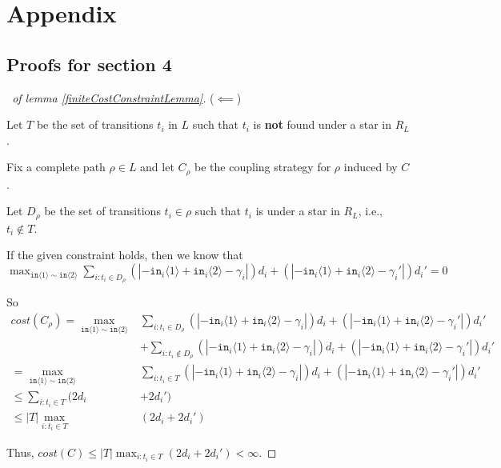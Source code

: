 \documentclass[12pt]{article}
\newcommand{\brangle}[1]{\langle#1 \rangle}
\theoremstyle{definition}
\begin{document}
\section{Appendix}

\subsection{Proofs for section 4}


\begin{proof}[\proofname~of lemma \ref{finiteCostConstraintLemma}]

    ($\impliedby$)

    Let $T$ be the set of transitions $t_i$ in $L$ such that $t_i$ is \textbf{not} found under a star in $R_L$. 

    Fix a complete path $\rho\in L$ and let $C_\rho$ be the coupling strategy for $\rho$ induced by $C$. 

    Let $D_\rho$ be the set of transitions $t_i\in \rho$ such that $t_i$ is under a star in $R_L$, i.e., $t_i\notin T$.  

    If the given constraint holds, then we know that $\max_{\texttt{in}\brangle{1}\sim\texttt{in}\brangle{2}}\sum_{i: t_i\in D_\rho}(|-\texttt{in}_i\brangle{1}+\texttt{in}_i\brangle{2}-\gamma_i|)d_i+(|-\texttt{in}_i\brangle{1}+\texttt{in}_i\brangle{2}-\gamma_i'|)d_i' = 0$

    So \begin{align*}
        cost(C_\rho) = \max_{\texttt{in}\brangle{1}\sim\texttt{in}\brangle{2}}&\sum_{i: t_i\in D_\rho}(|-\texttt{in}_i\brangle{1}+\texttt{in}_i\brangle{2}-\gamma_i|)d_i+(|-\texttt{in}_i\brangle{1}+\texttt{in}_i\brangle{2}-\gamma_i'|)d_i'\\
        &+\sum_{i: t_i\notin D_\rho}(|-\texttt{in}_i\brangle{1}+\texttt{in}_i\brangle{2}-\gamma_i|)d_i+(|-\texttt{in}_i\brangle{1}+\texttt{in}_i\brangle{2}-\gamma_i'|)d_i'\\
        = \max_{\texttt{in}\brangle{1}\sim\texttt{in}\brangle{2}}&\sum_{i: t_i\in T}(|-\texttt{in}_i\brangle{1}+\texttt{in}_i\brangle{2}-\gamma_i|)d_i+(|-\texttt{in}_i\brangle{1}+\texttt{in}_i\brangle{2}-\gamma_i'|)d_i'\\
        \leq \sum_{i:t_i\in T}(2d_i& + 2d_i')\\
        \leq |T|\max_{i:t_i\in T}&(2d_i + 2d_i')
    \end{align*}

    Thus, $cost(C)\leq |T|\max_{i:t_i\in T}(2d_i + 2d_i') <\infty$.


\end{proof}
\end{document}
